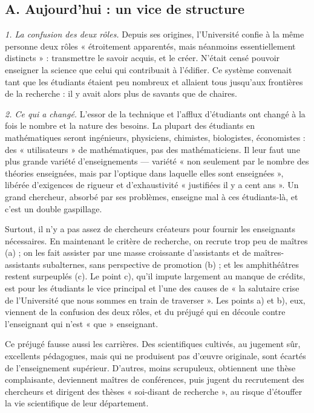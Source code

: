 \documentclass[11pt,a4paper]{article}
\begin{document}
\subsection*{A. Aujourd'hui : un vice de structure}

\emph{1. La confusion des deux rôles.} Depuis ses origines, l'Université
confie à la même personne deux rôles « étroitement apparentés, mais
néanmoins essentiellement distincts » : transmettre le savoir acquis, et le
créer. N'était censé pouvoir enseigner la science que celui qui contribuait à
l'édifier. Ce système convenait tant que les étudiants étaient peu nombreux et
allaient tous jusqu'aux frontières de la recherche : il y avait alors plus de
savants que de chaires.

\emph{2. Ce qui a changé.} L'essor de la technique et l'afflux d'étudiants
ont changé à la fois le nombre et la nature des besoins. La plupart des
étudiants en mathématiques seront ingénieurs, physiciens, chimistes,
biologistes, économistes : des « utilisateurs » de mathématiques, pas des
mathématiciens. Il leur faut une plus grande variété d'enseignements —
variété « non seulement par le nombre des théories enseignées, mais par
l'optique dans laquelle elles sont enseignées », libérée d'exigences de
rigueur et d'exhaustivité « justifiées il y a cent ans ». Un grand chercheur,
absorbé par ses problèmes, enseigne mal à ces étudiants-là, et c'est un double
gaspillage.

Surtout, il n'y a pas assez de chercheurs créateurs pour fournir les
enseignants nécessaires. En maintenant le critère de recherche, on recrute
trop peu de maîtres (a) ; on les fait assister par une masse croissante
d'assistants et de maîtres-assistants subalternes, sans perspective de
promotion (b) ; et les amphithéâtres restent surpeuplés (c). Le point c),
qu'il impute largement au manque de crédits, est pour les étudiants le vice
principal et l'une des causes de « la salutaire crise de l'Université que nous
sommes en train de traverser ». Les points a) et b), eux, viennent de la
confusion des deux rôles, et du préjugé qui en découle contre l'enseignant qui
n'est « que » enseignant.

Ce préjugé fausse aussi les carrières. Des scientifiques cultivés, au jugement
sûr, excellents pédagogues, mais qui ne produisent pas d'œuvre originale, sont
écartés de l'enseignement supérieur. D'autres, moins scrupuleux, obtiennent
une thèse complaisante, deviennent maîtres de conférences, puis jugent du
recrutement des chercheurs et dirigent des thèses « soi-disant de recherche »,
au risque d'étouffer la vie scientifique de leur département.
\end{document}
